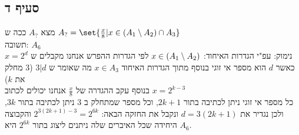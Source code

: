 \documentclass{article}
\DeclarePairedDelimiter\set\{\}
\begin{document}
\subsection*{סעיף ד}
מצא $A_?$ ככה ש $A_? = \set{\frac{x}{8} | x \in (A_1 \sub A_2) \cap A_3}$ \\
תשובה: $A_6$ \\
נימוק: עפ"י הגדרות האיחוד: $x \in (A_1 \setminus A_2)$  לפי הגדרות ההפרש אנחנו מקבלים ש $x = 2^d$  כאשר $d$ הוא מספר אי זוגי
בנוסף מתוך הגדרות האיחוד $x \in A_3$ מה שאומר ש $3 | d$ ($3$ מחלק את $k$) \\
בנוסף עקב ההגדרה של $\frac{x}{8}$ אנחנו יכולים לכתוב $x = 2^{k-3}$ \\
כל מספר אי זוגי ניתן לכתיבה בתור $2k + 1$, וכל מספר שמתחלק ב 3 ניתן לכתיבה בתור $3k$, ולכן נגדיר את $d = 3(2k + 1)$ ונקבל את החזקה הבאה: $2^{3(2k+1)-3} = 2^{6k}$
והקבוצה היחידה שכל האיברים שלה ניתנים ליצוג בתור $2^{6k}$ היא $A_6$. \\
\end{document}
